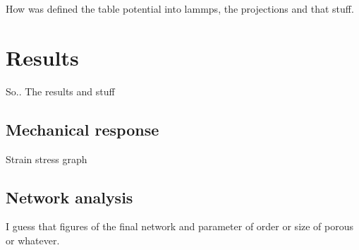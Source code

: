 How was defined the table potential into lammps, the projections and that stuff.

\section{Results}


So.. The results and stuff

\subsection{Mechanical response}

Strain stress graph

\subsection{Network analysis}

I guess that figures of the final network and parameter of order or size of porous or whatever.

